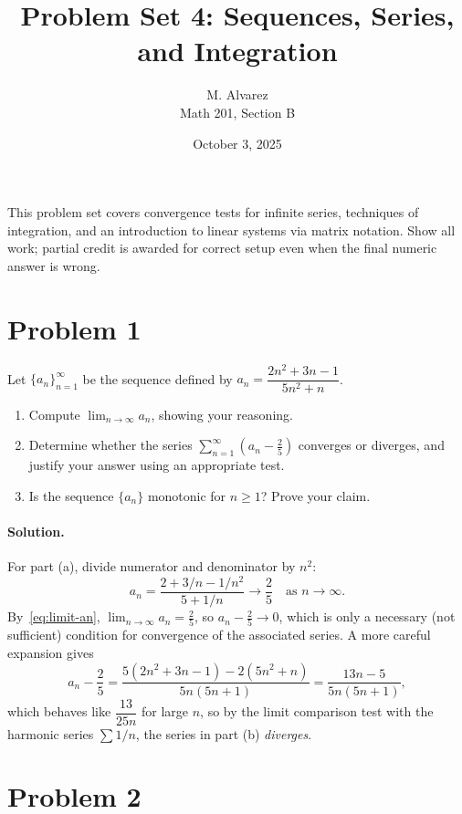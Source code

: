 \documentclass[11pt]{article}
\title{Problem Set 4: Sequences, Series, and Integration}
\author{M. Alvarez \\ Math 201, Section B}
\date{October 3, 2025}
\begin{document}
\maketitle

\noindent This problem set covers convergence tests for infinite series, techniques of
integration, and an introduction to linear systems via matrix notation. Show all work;
partial credit is awarded for correct setup even when the final numeric answer is wrong.

\section*{Problem 1}

Let $\{a_n\}_{n=1}^{\infty}$ be the sequence defined by $a_n = \dfrac{2n^2 + 3n - 1}{5n^2 + n}$.

\begin{enumerate}[label=(\alph*)]
  \item Compute $\displaystyle\lim_{n \to \infty} a_n$, showing your reasoning.
  \item Determine whether the series $\displaystyle\sum_{n=1}^{\infty} (a_n - \tfrac{2}{5})$
        converges or diverges, and justify your answer using an appropriate test.
  \item Is the sequence $\{a_n\}$ monotonic for $n \geq 1$? Prove your claim.
\end{enumerate}

\paragraph{Solution.} For part (a), divide numerator and denominator by $n^2$:
\begin{equation}
  \label{eq:limit-an}
  a_n = \frac{2 + 3/n - 1/n^2}{5 + 1/n} \longrightarrow \frac{2}{5} \quad \text{as } n \to \infty.
\end{equation}
By~\eqref{eq:limit-an}, $\lim_{n\to\infty} a_n = \tfrac{2}{5}$, so $a_n - \tfrac{2}{5} \to 0$,
which is only a necessary (not sufficient) condition for convergence of the associated series.
A more careful expansion gives
\[
  a_n - \frac{2}{5} = \frac{5(2n^2+3n-1) - 2(5n^2+n)}{5n(5n+1)} = \frac{13n - 5}{5n(5n+1)},
\]
which behaves like $\dfrac{13}{25n}$ for large $n$, so by the limit comparison test with the
harmonic series $\sum 1/n$, the series in part (b) \emph{diverges}.

\section*{Problem 2}
\end{document}
